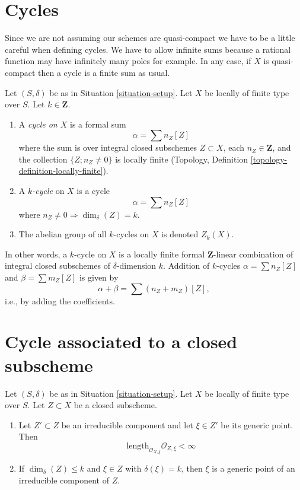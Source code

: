 \section{Cycles}
\label{section-cycles}

\noindent
Since we are not assuming our schemes are quasi-compact we have
to be a little careful when defining cycles. We have to allow
infinite sums because a rational function may have infinitely many
poles for example. In any case, if $X$ is quasi-compact then a
cycle is a finite sum as usual.

\begin{definition}
\label{definition-cycles}
Let $(S, \delta)$ be as in Situation \ref{situation-setup}.
Let $X$ be locally of finite type over $S$.
Let $k \in \mathbf{Z}$.
\begin{enumerate}
\item A {\it cycle on $X$} is a formal sum
$$
\alpha = \sum n_Z [Z]
$$
where the sum is over integral closed subschemes $Z \subset X$,
each $n_Z \in \mathbf{Z}$, and the collection
$\{Z; n_Z \not = 0\}$ is locally finite
(Topology, Definition \ref{topology-definition-locally-finite}).
\item A {\it $k$-cycle} on $X$ is a cycle
$$
\alpha = \sum n_Z [Z]
$$
where $n_Z \not = 0 \Rightarrow \dim_\delta(Z) = k$.
\item The abelian group of all $k$-cycles on $X$ is denoted $Z_k(X)$.
\end{enumerate}
\end{definition}

\noindent
In other words, a $k$-cycle on $X$
is a locally finite formal $\mathbf{Z}$-linear
combination of integral closed subschemes of $\delta$-dimension $k$.
Addition of $k$-cycles $\alpha = \sum n_Z[Z]$ and
$\beta = \sum m_Z[Z]$ is given by
$$
\alpha + \beta = \sum (n_Z + m_Z)[Z],
$$
i.e., by adding the coefficients.




\section{Cycle associated to a closed subscheme}
\label{section-cycle-of-closed-subscheme}

\begin{lemma}
\label{lemma-multiplicity-finite}
Let $(S, \delta)$ be as in Situation \ref{situation-setup}.
Let $X$ be locally of finite type over $S$.
Let $Z \subset X$ be a closed subscheme.
\begin{enumerate}
\item Let $Z' \subset Z$ be an irreducible component and
let $\xi \in Z'$ be its generic point.
Then
$$
\text{length}_{\mathcal{O}_{X, \xi}} \mathcal{O}_{Z, \xi} < \infty
$$
\item If $\dim_\delta(Z) \leq k$ and $\xi \in Z$ with
$\delta(\xi) = k$, then $\xi$ is a generic point of an
irreducible component of $Z$.
\end{enumerate}
\end{lemma}

